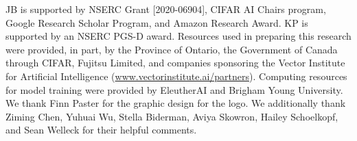 JB is supported by NSERC Grant [2020-06904], CIFAR AI Chairs program, Google Research Scholar Program, and Amazon Research Award. KP is supported by an NSERC PGS-D award. Resources used in preparing this research were provided, in part, by the Province of Ontario, the Government of Canada through CIFAR, Fujitsu Limited, and companies sponsoring the Vector Institute for Artificial Intelligence (\url{www.vectorinstitute.ai/partners}). Computing resources for model training were provided by EleutherAI and Brigham Young University. We thank Finn Paster for the graphic design for the logo. We additionally thank Ziming Chen, Yuhuai Wu, Stella Biderman, Aviya Skowron, Hailey Schoelkopf, and Sean Welleck for their helpful comments.%
\clearpage

\clearpage

